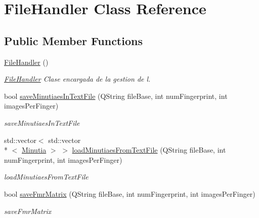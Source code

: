 \hypertarget{class_file_handler}{\section{File\+Handler Class Reference}
\label{class_file_handler}
}
\subsection*{Public Member Functions}
\begin{DoxyCompactItemize}
\item 
\hypertarget{class_file_handler_a0d1ac8e9911e19255e8b2d99c2d93f43}{\hyperlink{class_file_handler_a0d1ac8e9911e19255e8b2d99c2d93f43}{File\+Handler} ()}\label{class_file_handler_a0d1ac8e9911e19255e8b2d99c2d93f43}

\begin{DoxyCompactList}\small\item\em \hyperlink{class_file_handler}{File\+Handler} Clase encargada de la gestion de l. \end{DoxyCompactList}\item 
bool \hyperlink{class_file_handler_ac3203739d0d6a8992ea98a65efd780c5}{save\+Minutiaes\+In\+Text\+File} (Q\+String file\+Base, int num\+Fingerprint, int images\+Per\+Finger)
\begin{DoxyCompactList}\small\item\em save\+Minutiaes\+In\+Text\+File \end{DoxyCompactList}\item 
std\+::vector$<$ std\+::vector\\*
$<$ \hyperlink{class_minutia}{Minutia} $>$ $>$ \hyperlink{class_file_handler_a632eccb4604a393ffc6fb19ed93ebd7e}{load\+Minutiaes\+From\+Text\+File} (Q\+String file\+Base, int num\+Fingerprint, int images\+Per\+Finger)
\begin{DoxyCompactList}\small\item\em load\+Minutiaes\+From\+Text\+File \end{DoxyCompactList}\item 
bool \hyperlink{class_file_handler_a41c7670e08295f5998119809986d9045}{save\+Fmr\+Matrix} (Q\+String file\+Base, int num\+Fingerprint, int images\+Per\+Finger)
\begin{DoxyCompactList}\small\item\em save\+Fmr\+Matrix \end{DoxyCompactList}\end{DoxyCompactItemize}


